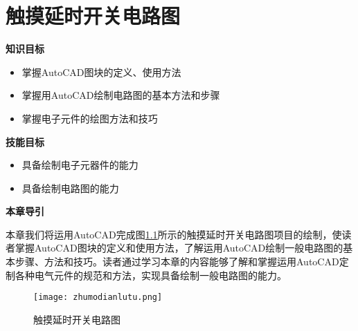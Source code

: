 \chapter{触摸延时开关电路图}

{\bfseries 知识目标}
\begin{itemize}
\item 掌握AutoCAD图块的定义、使用方法
\item 掌握用AutoCAD绘制电路图的基本方法和步骤
\item 掌握电子元件的绘图方法和技巧
\end{itemize}

{\bfseries 技能目标}
\begin{itemize}
\item 具备绘制电子元器件的能力
\item 具备绘制电路图的能力
\end{itemize}

{\bfseries 本章导引}

本章我们将运用AutoCAD完成图\ref{fig:zhumodianlu}所示的触摸延时开关电路图项目的绘制，使读者掌握AutoCAD图块的定义和使用方法，了解运用AutoCAD绘制一般电路图的基本步骤、方法和技巧。读者通过学习本章的内容能够了解和掌握运用AutoCAD定制各种电气元件的规范和方法，实现具备绘制一般电路图的能力。
\noindent
\begin{figure}[htbp]
\centering
\texttt{[image: zhumodianlutu.png]}
\caption{触摸延时开关电路图}\label{fig:zhumodianlu}
\end{figure}
\indent

\endinput
